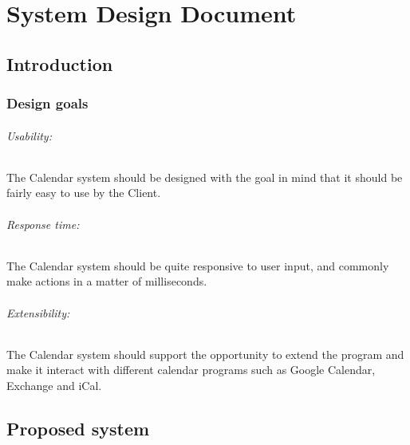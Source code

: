 



\part*{System Design Document}

\begin{versionhistory}
\end{versionhistory}

\chapter*{Introduction}

\section*{Design goals}

\paragraph{Usability: } The Calendar system should be designed with the goal in mind that it should be fairly easy to use by the Client. 

\paragraph{Response time: } The Calendar system should be quite responsive to user input, and commonly make actions in a matter of milliseconds. 

\paragraph{Extensibility: } The Calendar system should support the opportunity to extend the program and make it interact with different calendar programs such as Google Calendar, Exchange and iCal. 



\chapter*{Proposed system}

